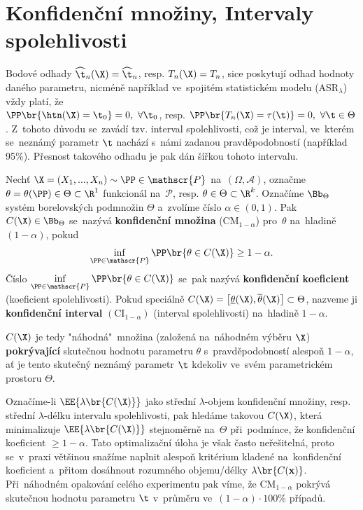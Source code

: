 
\chapter{Konfidenční množiny, Intervaly spolehlivosti}
Bodové odhady $\widehat{\t}_n(\X)=\widehat{\t}_n$, resp. $T_n(\X)=T_n$, sice poskytují odhad hodnoty daného parametru, nicméně například ve~spojitém statistickém modelu (ASR$_\lambda$) vždy platí, že\\ $\PP\br{\htn(\X)=\t_0}=0,~\forall\t_0$, resp. $\PP\br{T_n(\X)=\tau(\t)}=0,~\forall\t\in\Theta$. Z~tohoto důvodu se~zavádí tzv. interval spolehlivosti, což je interval, ve~kterém se~neznámý parametr $\t$ nachází s~námi zadanou pravděpodobností (například 95\%). Přesnost takového odhadu je pak dán šířkou tohoto intervalu.


\begin{define}
	Nechť $\X=(X_1,...,X_n)\sim\PP\in\mathscr{P}$ na~$(\Omega,\mathcal{A})$, označme $\theta=\theta(\PP)\in\Theta\subset\R^1$ funkcionál na~$\mathscr{P}$, resp. $\theta\in\Theta\subset\R^k$. Označíme $\Bb_\Theta$ systém borelovských podmnožin $\Theta$ a~zvolíme číslo $\alpha\in(0,1)$. Pak $C(\X)\in\Bb_\Theta$ se~nazývá \textbf{konfidenční množina} ($\mathrm{CM}_{1-\alpha}$) pro~$\theta$ na~hladině $(1-\alpha)$, pokud  $$\inf\limits_{\PP\in\mathscr{P}}\PP\br{\theta\in C(\X)}\geq 1-\alpha.$$ Číslo $\inf\limits_{\PP\in\mathscr{P}}\PP\br{\theta\in C(\X)}$ se~pak nazývá \textbf{konfidenční koeficient} (koeficient spolehlivosti).
	Pokud speciálně $C(\X)=\big[ \underline{\theta}(\X),\overline{\theta}(\X) \big]\subset\Theta$, nazveme ji \textbf{konfidenční interval} $(\mathrm{CI}_{1-\alpha})$ (interval spolehlivosti) na~hladině $1-\alpha$.
\end{define}
\begin{remark}
	$C(\X)$ je tedy "náhodná"~množina (založená na~náhodném výběru $\X$)\\ \textbf{pokrývající} skutečnou hodnotu parametru $\theta$ s~pravděpodobností alespoň $1-\alpha$, ať je tento skutečný neznámý parametr $\t$ kdekoliv ve~svém parametrickém prostoru $\Theta$. 
	
	Označíme-li
	$\EE{\lambda\br{C(\X)}}$ jako střední $\lambda$-objem konfidenční množiny, resp. střední $\lambda$-délku intervalu spolehlivosti, pak hledáme takovou $C(\X)$, která minimalizuje $\EE{\lambda\br{C(\X)}}$ stejnoměrně na~$\Theta$ při~podmínce, že konfidenční koeficient $\geq 1-\alpha$. Tato optimalizační úloha je však často neřešitelná, proto se~v~praxi většinou snažíme naplnit alespoň kritérium kladené na~konfidenční koeficient a~přitom dosáhnout rozumného objemu/délky $\lambda\br{C(\textbf{x})}$. Při~náhodném opakování celého experimentu pak víme, že $\mathrm{CM}_{1-\alpha}$ pokrývá skutečnou hodnotu parametru $\t$ v~průměru ve~$(1-\alpha)\cdot 100$\% případů. 
\end{remark}	


